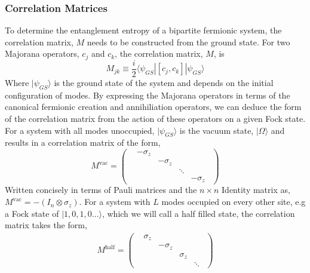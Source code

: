 \subsubsection{Correlation Matrices}
To determine the entanglement entropy of a bipartite fermionic system, the correlation matrix, $M$ needs to be constructed from the ground state. For two Majorana operators, $c_j$ and $c_k$, the correlation matrix, $M$, is
\begin{equation}
    M_{jk} \equiv \frac{i}{2}\langle\psi_{GS} | [c_j, c_k] |\psi_{GS}\rangle
\end{equation}
Where $|\psi_{GS}\rangle$ is the ground state of the system and depends on the initial configuration of modes.
By expressing the Majorana operators in terms of the canonical fermionic creation and annihiliation operators, we can deduce the form of the correlation matrix from the action of these operators on a given Fock state. For a system with all modes unoccupied, $|\psi_{GS}\rangle$ is the vacuum state, $|\Omega\rangle$ and results in a correlation matrix of the form, 
\begin{equation}\label{vac}
    M^{\text{vac}} = 
            \begin{pmatrix}
            & -\sigma_z &  &\\
             && -\sigma_z &\\
           & && \ddots&\\
           & &&& -\sigma_z  \ \
        \end{pmatrix}
\end{equation}
Written concisely in terms of Pauli matrices and the $n\times n$ Identity matrix as, $M^{\text{vac}} = -(I_n \otimes \sigma_{z})$. For a system with $L$ modes occupied on every other site, e.g a Fock state of $|1, 0, 1, 0 \dots \rangle$, which we will call a half filled state,  the correlation matrix takes the form, 
\begin{align}\label{half}
        M^{\text{half}} = 
        \begin{pmatrix}
            & \sigma_z &  &\\
             && -\sigma_z &\\
           & && \sigma_z&\\
           & &&& \ddots  \ \
        \end{pmatrix}
    \end{align}

